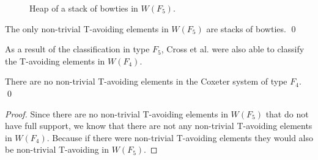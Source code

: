 \begin{figure*}[h!] \centering
{}
\caption{Heap of a stack of bowties in $W(F_5)$.}\label{fig:stackobowties}
\end{figure*}

\begin{proposition}
The only non-trivial T-avoiding elements in $W(F_5)$ are stacks of bowties. \qed	
\end{proposition}


As a result of the classification in type $F_5$, Cross et al. were also able to classify the T-avoiding elements in $W(F_4)$. 

\begin{corollary}
There are no non-trivial T-avoiding elements in the Coxeter system of type $F_4$. \qed	
\begin{proof}
	Since there are no non-trivial T-avoiding elements in $W(F_5)$ that do not have full support, we know that there are not any non-trivial T-avoiding elements in $W(F_4)$. Because if there were non-trivial T-avoiding elements they would also be non-trivial T-avoiding in $W(F_5)$.
\end{proof}
\end{corollary}

